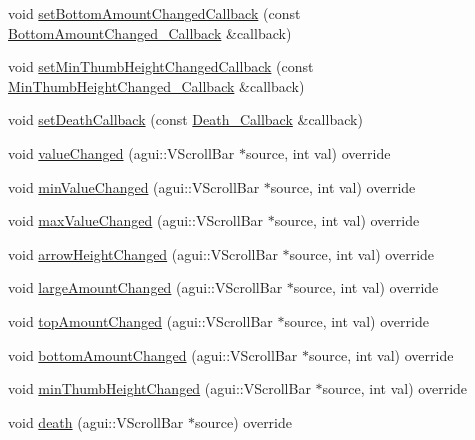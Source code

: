 \begin{DoxyCompactItemize}
\item 
void \mbox{\hyperlink{classec_1_1_generic_v_scroll_bar_listener_aa023fa94de283eedaaf6e99d6ac6b19d}{set\+Bottom\+Amount\+Changed\+Callback}} (const \mbox{\hyperlink{classec_1_1_generic_v_scroll_bar_listener_abcc4e00e4c23a24981d7fc0a7538d00f}{Bottom\+Amount\+Changed\+\_\+\+Callback}} \&callback)
\item 
void \mbox{\hyperlink{classec_1_1_generic_v_scroll_bar_listener_aaaf228b37c8d4e3c79ffd3f61052c7bf}{set\+Min\+Thumb\+Height\+Changed\+Callback}} (const \mbox{\hyperlink{classec_1_1_generic_v_scroll_bar_listener_a64ef9708903097baf5cc98348f8a02fa}{Min\+Thumb\+Height\+Changed\+\_\+\+Callback}} \&callback)
\item 
void \mbox{\hyperlink{classec_1_1_generic_v_scroll_bar_listener_a9284e4e6c9724920e7cbf340924bde0c}{set\+Death\+Callback}} (const \mbox{\hyperlink{classec_1_1_generic_v_scroll_bar_listener_a821b55a49a6b6324b98a66872b19a823}{Death\+\_\+\+Callback}} \&callback)
\item 
void \mbox{\hyperlink{classec_1_1_generic_v_scroll_bar_listener_a6718d45dd6536a326181775dc2c16570}{value\+Changed}} (agui\+::\+V\+Scroll\+Bar $\ast$source, int val) override
\item 
void \mbox{\hyperlink{classec_1_1_generic_v_scroll_bar_listener_ac21e3f604402a12d544a9a31c69d2072}{min\+Value\+Changed}} (agui\+::\+V\+Scroll\+Bar $\ast$source, int val) override
\item 
void \mbox{\hyperlink{classec_1_1_generic_v_scroll_bar_listener_a7c8d8f410bec26023d5d4f3ccdb24edf}{max\+Value\+Changed}} (agui\+::\+V\+Scroll\+Bar $\ast$source, int val) override
\item 
void \mbox{\hyperlink{classec_1_1_generic_v_scroll_bar_listener_ad42d38aab565aae07a4499f9fac0f0fd}{arrow\+Height\+Changed}} (agui\+::\+V\+Scroll\+Bar $\ast$source, int val) override
\item 
void \mbox{\hyperlink{classec_1_1_generic_v_scroll_bar_listener_ab96c61748309723d7f2e6d1738992221}{large\+Amount\+Changed}} (agui\+::\+V\+Scroll\+Bar $\ast$source, int val) override
\item 
void \mbox{\hyperlink{classec_1_1_generic_v_scroll_bar_listener_aa781034d565c6b2f50ffea047fd0dc5f}{top\+Amount\+Changed}} (agui\+::\+V\+Scroll\+Bar $\ast$source, int val) override
\item 
void \mbox{\hyperlink{classec_1_1_generic_v_scroll_bar_listener_ab665f24733d6155f439879b1c44697a1}{bottom\+Amount\+Changed}} (agui\+::\+V\+Scroll\+Bar $\ast$source, int val) override
\item 
void \mbox{\hyperlink{classec_1_1_generic_v_scroll_bar_listener_a1f931df46faff23f67332fc43d86420d}{min\+Thumb\+Height\+Changed}} (agui\+::\+V\+Scroll\+Bar $\ast$source, int val) override
\item 
void \mbox{\hyperlink{classec_1_1_generic_v_scroll_bar_listener_a4fc1816369254bff6398ec86ddf430f7}{death}} (agui\+::\+V\+Scroll\+Bar $\ast$source) override
\end{DoxyCompactItemize}


